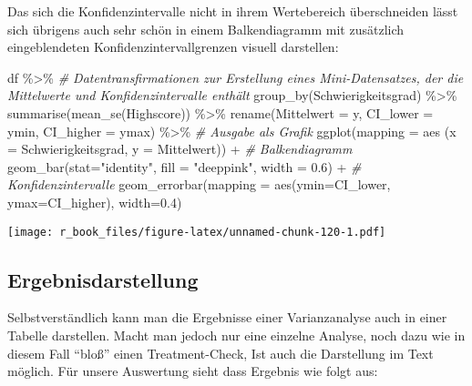 \documentclass[
]{book}
\newenvironment{Shaded}{\begin{snugshade}}{\end{snugshade}}
\newcommand{\AttributeTok}[1]{\textcolor[rgb]{0.77,0.63,0.00}{#1}}
\newcommand{\CommentTok}[1]{\textcolor[rgb]{0.56,0.35,0.01}{\textit{#1}}}
\newcommand{\FloatTok}[1]{\textcolor[rgb]{0.00,0.00,0.81}{#1}}
\newcommand{\FunctionTok}[1]{\textcolor[rgb]{0.00,0.00,0.00}{#1}}
\newcommand{\NormalTok}[1]{#1}
\newcommand{\SpecialCharTok}[1]{\textcolor[rgb]{0.00,0.00,0.00}{#1}}
\newcommand{\StringTok}[1]{\textcolor[rgb]{0.31,0.60,0.02}{#1}}
\begin{document}
Das sich die Konfidenzintervalle nicht in ihrem Wertebereich überschneiden lässt sich übrigens auch sehr schön in einem Balkendiagramm mit zusätzlich eingeblendeten Konfidenzintervallgrenzen visuell darstellen:

\begin{Shaded}
\begin{Highlighting}[]
\NormalTok{df }\SpecialCharTok{\%\textgreater{}\%} 
  \CommentTok{\# Datentransfirmationen zur Erstellung eines Mini{-}Datensatzes, der die Mittelwerte und Konfidenzintervalle enthält}
  \FunctionTok{group\_by}\NormalTok{(Schwierigkeitsgrad) }\SpecialCharTok{\%\textgreater{}\%}
  \FunctionTok{summarise}\NormalTok{(}\FunctionTok{mean\_se}\NormalTok{(Highscore)) }\SpecialCharTok{\%\textgreater{}\%}
  \FunctionTok{rename}\NormalTok{(}\AttributeTok{Mittelwert =}\NormalTok{ y, }\AttributeTok{CI\_lower =}\NormalTok{ ymin, }\AttributeTok{CI\_higher =}\NormalTok{ ymax) }\SpecialCharTok{\%\textgreater{}\%}
  \CommentTok{\# Ausgabe als Grafik}
  \FunctionTok{ggplot}\NormalTok{(}\AttributeTok{mapping =} \FunctionTok{aes}\NormalTok{ (}\AttributeTok{x =}\NormalTok{ Schwierigkeitsgrad, }\AttributeTok{y =}\NormalTok{ Mittelwert)) }\SpecialCharTok{+} 
  \CommentTok{\# Balkendiagramm}
  \FunctionTok{geom\_bar}\NormalTok{(}\AttributeTok{stat=}\StringTok{"identity"}\NormalTok{, }\AttributeTok{fill =} \StringTok{"deeppink"}\NormalTok{, }\AttributeTok{width =} \FloatTok{0.6}\NormalTok{) }\SpecialCharTok{+}
  \CommentTok{\# Konfidenzintervalle}
  \FunctionTok{geom\_errorbar}\NormalTok{(}\AttributeTok{mapping =} \FunctionTok{aes}\NormalTok{(}\AttributeTok{ymin=}\NormalTok{CI\_lower, }\AttributeTok{ymax=}\NormalTok{CI\_higher), }\AttributeTok{width=}\FloatTok{0.4}\NormalTok{)}
\end{Highlighting}
\end{Shaded}

\texttt{[image: r\_book\_files/figure-latex/unnamed-chunk-120-1.pdf]}

\hypertarget{ergebnisdarstellung}{%
\subsection{Ergebnisdarstellung}\label{ergebnisdarstellung}}

Selbstverständlich kann man die Ergebnisse einer Varianzanalyse auch in einer Tabelle darstellen. Macht man jedoch nur eine einzelne Analyse, noch dazu wie in diesem Fall ``bloß'' einen Treatment-Check, Ist auch die Darstellung im Text möglich. Für unsere Auswertung sieht dass Ergebnis wie folgt aus:
\end{document}
